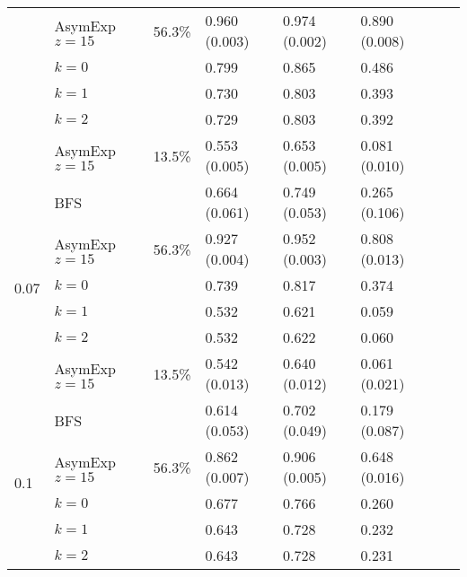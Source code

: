 \documentclass[a4paper,final,notitlepage,11pt,svgnames]{scrartcl}
\begin{document}
\begin{table}[htpb]
\begin{tabular}{llllllll}
		                      & AsymExp $z=15$ & 56.3\%       & 0.960 (0.003) & 0.974 (0.002) & 0.890 (0.008)  &               &    \\
		                      & $k=0$          &              & 0.799         & 0.865         & 0.486          &               & \\
		                      & $k=1$          &              & 0.730         & 0.803         & 0.393          &               & \\
		                      & $k=2$          &              & 0.729         & 0.803         & 0.392          &               & \\
		                      & AsymExp $z=15$ & 13.5\%       & 0.553 (0.005) & 0.653 (0.005) & 0.081 (0.010)  &               &    \\
		\cmidrule(r){2-6}
		\multirow{6}{*}{0.07} & BFS            &              & 0.664 (0.061) & 0.749 (0.053) & 0.265 (0.106)  &               & \\
		                      & AsymExp $z=15$ & 56.3\%       & 0.927 (0.004) & 0.952 (0.003) & 0.808 (0.013)  &               &    \\
		                      & $k=0$          &              & 0.739         & 0.817         & 0.374          &               & \\
		                      & $k=1$          &              & 0.532         & 0.621         & 0.059          &               & \\
		                      & $k=2$          &              & 0.532         & 0.622         & 0.060          &               & \\
		                      & AsymExp $z=15$ & 13.5\%       & 0.542 (0.013) & 0.640 (0.012) & 0.061 (0.021)  &               &    \\
		\cmidrule(r){2-6}
		\multirow{6}{*}{0.1}  & BFS            &              & 0.614 (0.053) & 0.702 (0.049) & 0.179 (0.087)  &               & \\
		                      & AsymExp $z=15$ & 56.3\%       & 0.862 (0.007) & 0.906 (0.005) & 0.648 (0.016)  &               &    \\
		                      & $k=0$          &              & 0.677         & 0.766         & 0.260          &               & \\
		                      & $k=1$          &              & 0.643         & 0.728         & 0.232          &               & \\
		                      & $k=2$          &              & 0.643         & 0.728         & 0.231          &               & \\

\end{tabular}
\end{table}
\end{document}
